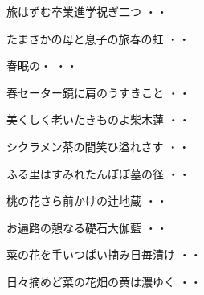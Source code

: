 \vspace{0.6cm}
\begin{shiika}旅はずむ卒業進学祝ぎ二つ
\hfill{・・}\end{shiika}
\vspace{0.6cm}
\begin{shiika}たまさかの母と息子の旅春の虹
\hfill{・・}\end{shiika}
\vspace{0.6cm}
\begin{shiika}春眠の・
\hfill{・・}\end{shiika}
\vspace{0.6cm}
\begin{shiika}春セーター鏡に肩のうすきこと
\hfill{・・}\end{shiika}
\vspace{0.6cm}
\begin{shiika}美くしく老いたきものよ柴木蓮
\hfill{・・}\end{shiika}
\vspace{0.6cm}
\begin{shiika}シクラメン茶の間笑ひ溢れさす
\hfill{・・}\end{shiika}
\vspace{0.6cm}
\begin{shiika}ふる里はすみれたんぽぽ墓の径
\hfill{・・}\end{shiika}
\vspace{0.6cm}
\begin{shiika}桃の花さら前かけの辻地蔵
\hfill{・・}\end{shiika}
\vspace{0.6cm}
\begin{shiika}お遍路の憩なる礎石大伽藍
\hfill{・・}\end{shiika}
\vspace{0.6cm}
\begin{shiika}菜の花を手いつぱい摘み日毎漬け
\hfill{・・}\end{shiika}
\vspace{0.6cm}
\begin{shiika}日々摘めど菜の花畑の黄は濃ゆく
\hfill{・・}\end{shiika}
